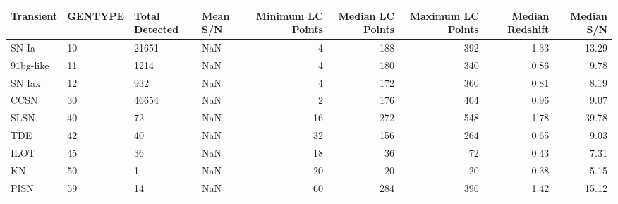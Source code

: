 \begin{tabular}{llllrrrrr}
\toprule
Transient & GENTYPE & Total Detected & Mean S/N & Minimum LC Points & Median LC Points & Maximum LC Points & Median Redshift & Median S/N \\
\midrule
SN Ia & 10 & 21651 & NaN & 4 & 188 & 392 & 1.33 & 13.29 \\
91bg-like & 11 & 1214 & NaN & 4 & 180 & 340 & 0.86 & 9.78 \\
SN Iax & 12 & 932 & NaN & 4 & 172 & 360 & 0.81 & 8.19 \\
CCSN & 30 & 46654 & NaN & 2 & 176 & 404 & 0.96 & 9.07 \\
SLSN & 40 & 72 & NaN & 16 & 272 & 548 & 1.78 & 39.78 \\
TDE & 42 & 40 & NaN & 32 & 156 & 264 & 0.65 & 9.03 \\
ILOT & 45 & 36 & NaN & 18 & 36 & 72 & 0.43 & 7.31 \\
KN & 50 & 1 & NaN & 20 & 20 & 20 & 0.38 & 5.15 \\
PISN & 59 & 14 & NaN & 60 & 284 & 396 & 1.42 & 15.12 \\
\bottomrule
\end{tabular}
